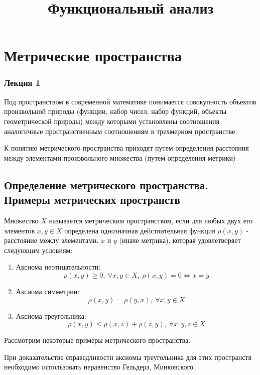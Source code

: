 \documentclass[14pt]{extarticle}
\title{\textbf{Функциональный анализ}}
\date{}
\theoremstyle{definition}
\theoremstyle{remark}
\newcommand{\be}{\begin{enumerate}}
\newcommand{\ee}{\end{enumerate}}
\renewcommand{\[}{\begin{dmath*}[compact]}
\renewcommand{\]}{\end{dmath*}}
\newcommand{\sep}{ , \ \allowbreak }
\begin{document}
\sloppy

\maketitle

\tableofcontents

\section{Метрические пространства} \label{sec:mp}

\subsubsection{Лекция 1}

Под пространством в современной математике понимается совокупность объектов
произвольной природы (функции, набор чисел, набор функций, объекты
геометрической природы) между которыми установлены соотношения аналогичные
пространственным соотношениям в трехмерном пространстве.

К понятию метрического пространства приходят путем определения расстояния между
элементами произвольного множества (путем определения метрики)

\subsection{Определение метрического пространства. Примеры метрических пространств}

Множество $X$ называется метрическим пространством, если для любых двух его
элементов $x, y \in X$ определена однозначная действительная функция
$\rho(x, y)$ - расстояние между элементами.
$x$ и $y$ (иначе метрика), которая удовлетворяет следующим условиям:

\be
  \item Аксиома неотицательности:
  \[ \rho(x, y) \geq 0 \sep {\forall x, y \in X} \sep
  {\rho(x, y) = 0} \Leftrightarrow {x = y} \]
  \item Аксиома симметрии:
  \[\rho(x, y) = \rho(y, x) \sep {\forall x, y \in X}\]
  \item Аксиома треугольника:
  \[\rho(x, y) \leq \rho(x, z) + \rho(z, y) \sep {\forall x, y, z \in X}\]
\ee

Рассмотрим некоторые примеры метрического пространства.

При доказательстве справедливости аксиомы треугольника для этих пространств
необходимо использовать неравенство Гельдера, Минковского.
\end{document}
